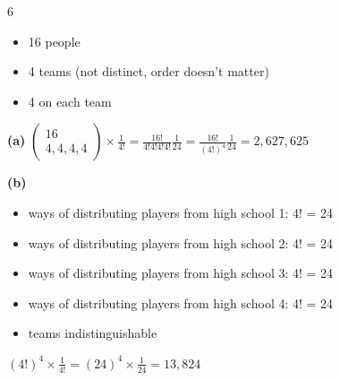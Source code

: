 \documentclass[12 pt]{article}
\begin{document}
    \begin{exercise}{6}
    \hfill

    \begin{itemize}
        \item 16 people
        \item 4 teams (not distinct, order doesn't matter)
        \item 4 on each team
    \end{itemize}

    \textbf{(a)} $\begin{pmatrix}
        16 \\
        4, 4, 4, 4
    \end{pmatrix} \times \frac{1}{4!}= \frac{16!}{4!4!4!4!} \frac{1}{24} = \frac{16!}{(4!)^4} \frac{1}{24}= 2,627,625$

    \textbf{(b)} 
    \begin{itemize}
        \item ways of distributing players from high school 1: 4! = 24
        \item ways of distributing players from high school 2: 4! = 24
        \item ways of distributing players from high school 3: 4! = 24
        \item ways of distributing players from high school 4: 4! = 24
        \item teams indistinguishable
    \end{itemize}

    $(4!)^4 \times \frac{1}{4!}= (24)^4 \times \frac{1}{24} = 13,824$  
    \end{exercise}
\end{document}
